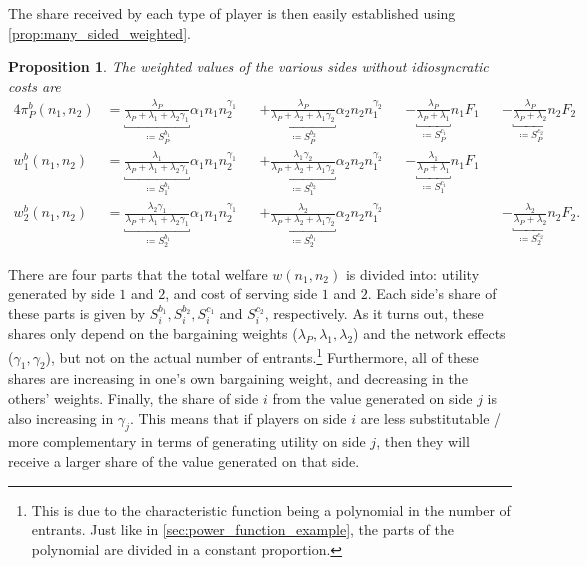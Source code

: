 \documentclass[a4paper]{article}
\newtheorem{proposition}{Proposition}
\begin{document}
The share received by each type of player is then easily established using \cref{prop:many_sided_weighted}.
\begin{proposition}
    \label{prop:platform_bargaining_last_period}
    The weighted values of the various sides without idiosyncratic costs are
    \begin{alignat*}{4}
        \pi_P^b(n_1, n_2) &= \underbracket{\frac{\lambda_P}{\lambda_P + \lambda_1 + \lambda_2\gamma_1}}_{\coloneqq S_P^{b_1}} \alpha_1 n_1 n_2^{\gamma_1} &&+ \underbracket{\frac{\lambda_P}{\lambda_P + \lambda_2 + \lambda_1\gamma_2}}_{\coloneqq S_P^{b_2}} \alpha_2 n_2 n_1^{\gamma_2} &&- \underbracket{\frac{\lambda_P}{\lambda_P + \lambda_1}}_{\coloneqq S_P^{c_1}} n_1 F_1 &&- \underbracket{\frac{\lambda_P}{\lambda_P + \lambda_2}}_{\coloneqq S_P^{c_2}} n_2 F_2 \\
        w_1^b(n_1, n_2) &= \underbracket{\frac{\lambda_1}{\lambda_P + \lambda_1 + \lambda_2\gamma_1}}_{\coloneqq S_1^{b_1}} \alpha_1 n_1 n_2^{\gamma_1} &&+ \underbracket{\frac{\lambda_1 \gamma_2}{\lambda_P + \lambda_2 + \lambda_1\gamma_2}}_{\coloneqq S_1^{b_2}}  \alpha_2 n_2 n_1^{\gamma_2} &&- \underbracket{\frac{\lambda_1}{\lambda_P + \lambda_1}}_{\coloneqq S_1^{c_1}} n_1 F_1 && \\
        w_2^b(n_1, n_2) &= \underbracket{\frac{\lambda_2\gamma_1}{\lambda_P + \lambda_1 + \lambda_2\gamma_1}}_{\coloneqq S_2^{b_1}} \alpha_1 n_1 n_2^{\gamma_1} &&+ \underbracket{\frac{\lambda_2}{\lambda_P + \lambda_2 + \lambda_1\gamma_2}}_{\coloneqq S_2^{b_1}} \alpha_2 n_2 n_1^{\gamma_2} && &&- \underbracket{\frac{\lambda_2}{\lambda_P + \lambda_2}}_{\coloneqq S_2^{c_2}} n_2 F_2.
    \end{alignat*}
\end{proposition}

There are four parts that the total welfare $w(n_1, n_2)$ is divided into: utility generated by side $1$ and $2$, and cost of serving side $1$ and $2$.
Each side's share of these parts is given by $S_i^{b_1}, S_i^{b_2}, S_i^{c_1}$ and $S_i^{c_2}$, respectively.
As it turns out, these shares only depend on the bargaining weights ($\lambda_P, \lambda_1, \lambda_2$) and the network effects ($\gamma_1, \gamma_2$), but not on the actual number of entrants.\footnote{
    This is due to the characteristic function being a polynomial in the number of entrants.
    Just like in \cref{sec:power_function_example}, the parts of the polynomial are divided in a constant proportion.
}
Furthermore, all of these shares are increasing in one's own bargaining weight, and decreasing in the others' weights.
Finally, the share of side $i$ from the value generated on side $j$ is also increasing in $\gamma_j$.
This means that if players on side $i$ are less substitutable / more complementary in terms of generating utility on side $j$, then they will receive a larger share of the value generated on that side.
\end{document}
